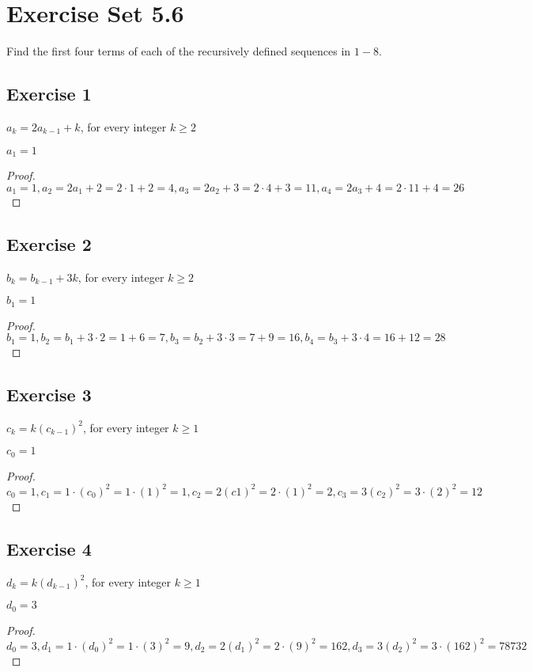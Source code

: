 \documentclass[14pt]{extarticle}
\newcommand{\cy}{\color{cyan}}
\begin{document}
\section{Exercise Set 5.6}

 {\cy Find the first four terms of each of the recursively defined sequences in $1-8$.}

\subsection{Exercise 1}
$a_k = 2a_{k - 1} + k$, for every integer $k \geq 2$

$a_1 = 1$

\begin{proof}
    $a_1 = 1, a_2 = 2a_1 + 2 = 2 \cdot 1 + 2 = 4, a_3 = 2a_2 + 3 = 2 \cdot 4 + 3 = 11, a_4 = 2a_3 + 4 = 2 \cdot 11 + 4 = 26$
\end{proof}

\subsection{Exercise 2}
$b_k = b_{k - 1} + 3k$, for every integer $k \geq 2$

$b_1 = 1$

\begin{proof}
    $b_1 = 1, b_2 = b_1 + 3 \cdot 2 = 1 + 6 = 7, b_3 = b_2 + 3 \cdot 3 = 7 + 9 = 16, b_4 = b_3 + 3 \cdot 4 = 16 + 12 = 28$
\end{proof}

\subsection{Exercise 3}
$c_k = k(c_{k-1})^2$, for every integer $k \geq 1$

$c_0 = 1$

\begin{proof}
    $c_0 = 1, c_1 = 1 \cdot (c_0)^2 = 1 \cdot (1)^2 = 1, c_2 = 2(c1)^2 = 2 \cdot (1)^2 = 2, c_3 = 3(c_2)^2 = 3 \cdot (2)^2 = 12$
\end{proof}

\subsection{Exercise 4}
$d_k = k(d_{k - 1})^2$, for every integer $k \geq 1$

$d_0 = 3$

\begin{proof}
    $d_0 = 3, d_1 = 1 \cdot (d_0)^2 = 1 \cdot (3)^2 = 9, d_2 = 2(d_1)^2 = 2 \cdot (9)^2 = 162, d_3 = 3(d_2)^2 = 3 \cdot (162)^2 = 78732$
\end{proof}
\end{document}
